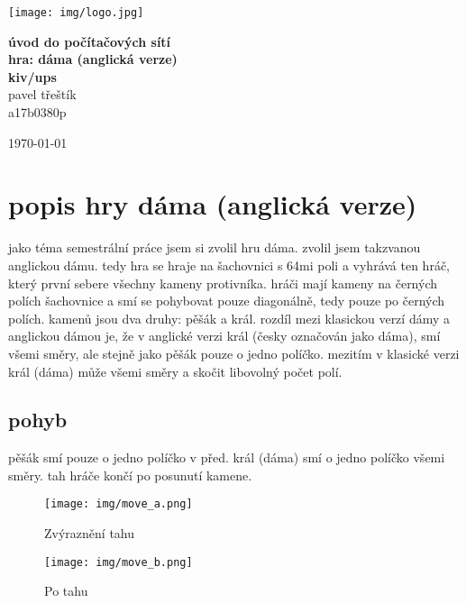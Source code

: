 \documentclass[12pt]{report}
\begin{document}
%

\begin{titlepage}
\centerline{\texttt{[image: img/logo.jpg]}}
\begin{center}
\vspace{30px}
{\huge
\textbf{úvod do počítačových sítí}\\
\textbf{hra: dáma (anglická verze)}\\
\vspace{1cm}
}
{\large
\textbf{kiv/ups}\\
\vspace{1cm}
}
\vspace{1cm}
{\large
pavel třeštík\\
}
{\normalsize
a17b0380p
}
\end{center}
\vspace{\fill}
\hfill
\begin{minipage}[t]{7cm}
\flushright
\today
\end{minipage}
\end{titlepage}


\tableofcontents



\chapter{popis hry dáma (anglická verze)}
jako téma semestrální práce jsem si zvolil hru dáma. zvolil jsem takzvanou anglickou dámu. tedy
hra se hraje na šachovnici s 64mi poli a vyhrává ten hráč, který první sebere všechny
kameny protivníka. hráči mají kameny na černých polích šachovnice a smí se pohybovat pouze
diagonálně, tedy pouze po černých polích. kamenů jsou dva druhy: pěšák a král. rozdíl mezi
klasickou verzí dámy a anglickou dámou je, že v anglické verzi král (česky označován jako dáma),
smí všemi směry, ale stejně jako pěšák pouze o jedno políčko. mezitím v klasické verzi
král (dáma) může všemi směry a skočit libovolný počet polí.

\section{pohyb}
pěšák smí pouze o jedno políčko v před. král (dáma) smí o jedno políčko všemi směry. tah hráče
končí po posunutí kamene.

\begin{figure}[H]
  \centering
  \begin{minipage}[b]{0.4\textwidth}
    \texttt{[image: img/move\_a.png]}
    \caption{Zvýraznění tahu}
  \end{minipage}
  \hfill
  \begin{minipage}[b]{0.4\textwidth}
    \texttt{[image: img/move\_b.png]}
    \caption{Po tahu}
  \end{minipage}
\end{figure}
\end{document}
